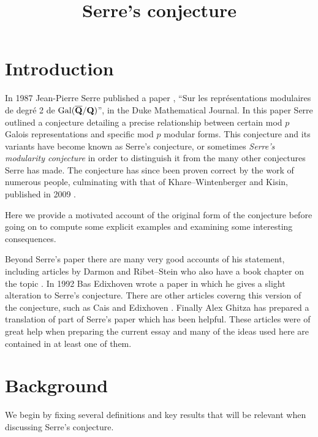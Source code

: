 \documentclass[a4paper,12pt]{article}
\title{Serre's conjecture}
\author{}
\date{}
\begin{document}
\maketitle
\vspace{-45pt}
\tableofcontents
\clearpage


\section{Introduction}
In 1987 Jean-Pierre Serre published a paper \cite{Serre87}, ``Sur les repr\'esentations modulaires de degr\'e 2 de $\operatorname{Gal}(\overline{\mathbf{Q}}/\mathbf{Q})$'', in the Duke Mathematical Journal.
In this paper Serre outlined a conjecture detailing a precise relationship between certain mod $p$ Galois representations and specific mod $p$ modular forms.
This conjecture and its variants have become known as Serre's conjecture, or sometimes \emph{Serre's modularity conjecture} in order to distinguish it from the many other conjectures Serre has made.
The conjecture has since been proven correct by the work of numerous people, culminating with that of Khare--Wintenberger and Kisin, published in 2009 \cite{KWI,KWII,Kisin}.

Here we provide a motivated account of the original form of the conjecture before going on to compute some explicit examples and examining some interesting consequences.

Beyond Serre's paper there are many very good accounts of his statement, including articles by Darmon \cite{Darmon} and Ribet--Stein \cite{RibetStein} who also have a book chapter on the topic \cite{RibetSteinBook}.
In 1992 Bas Edixhoven wrote a paper \cite{EdixhovenWeight} in which he gives a slight alteration to Serre's conjecture.
There are other articles coverng this version of the conjecture, such as Cais \cite{Cais} and Edixhoven \cite{Edixhoven}. %
Finally Alex Ghitza has prepared a translation of part of Serre's paper \cite{Ghitza} which has been helpful.
These articles were of great help when preparing the current essay and many of the ideas used here are contained in at least one of them.


\section{Background}
We begin by fixing several definitions and key results that will be relevant when discussing Serre's conjecture.
\end{document}
